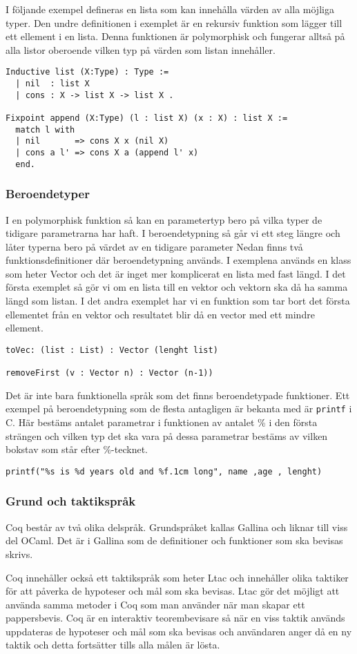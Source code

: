 I följande exempel defineras en lista som kan innehålla värden av alla möjliga
typer. Den undre definitionen i exemplet är en rekursiv funktion som lägger till
ett ellement i en lista. Denna funktionen är polymorphisk och fungerar alltså på
alla listor oberoende vilken typ på värden som listan innehåller.
\begin{verbatim}
Inductive list (X:Type) : Type :=
  | nil  : list X
  | cons : X -> list X -> list X .

Fixpoint append (X:Type) (l : list X) (x : X) : list X :=
  match l with
  | nil       => cons X x (nil X)
  | cons a l' => cons X a (append l' x)
  end.
\end{verbatim}

\subsubsection{Beroendetyper}
I en polymorphisk funktion så kan en parametertyp bero på vilka typer de
tidigare parametrarna har haft. I beroendetypning så går vi ett steg längre och
låter typerna bero på värdet av en tidigare parameter Nedan finns två
funktionsdefinitioner där beroendetypning används. I exemplena används en klass
som heter Vector och det är inget mer komplicerat en lista med fast längd. I
det första exemplet så gör vi om en lista till en vektor och vektorn ska då ha
samma längd som listan. I det andra exemplet har vi en funktion som tar bort
det första ellementet från en vektor och resultatet blir då en vector med ett
mindre ellement.
\begin{verbatim}
toVec: (list : List) : Vector (lenght list)

removeFirst (v : Vector n) : Vector (n-1))
\end{verbatim}
Det är inte bara funktionella språk som det finns beroendetypade funktioner.
Ett exempel på beroendetypning som de flesta antagligen är bekanta med är
\texttt{printf} i C. Här bestäms antalet parametrar i funktionen av antalet \%
i den första strängen och vilken typ det ska vara på dessa parametrar bestäms
av vilken bokstav som står efter \%-tecknet.
\begin{verbatim}
printf("%s is %d years old and %f.1cm long", name ,age , lenght)
\end{verbatim}


\subsubsection{Grund och taktikspråk}
Coq består av två olika delspråk. Grundspråket kallas Gallina och liknar till
viss del OCaml. Det är i Gallina som de definitioner och funktioner som ska
bevisas skrivs.

Coq innehåller också ett taktikspråk som heter Ltac och innehåller olika
taktiker för att påverka de hypoteser och mål som ska bevisas. Ltac gör det
möjligt att använda samma metoder i Coq som man använder när man skapar ett
pappersbevis. Coq är en interaktiv teorembevisare så när en viss taktik används
uppdateras de hypoteser och mål som ska bevisas och användaren anger då en ny
taktik och detta fortsätter tills alla målen är lösta.
